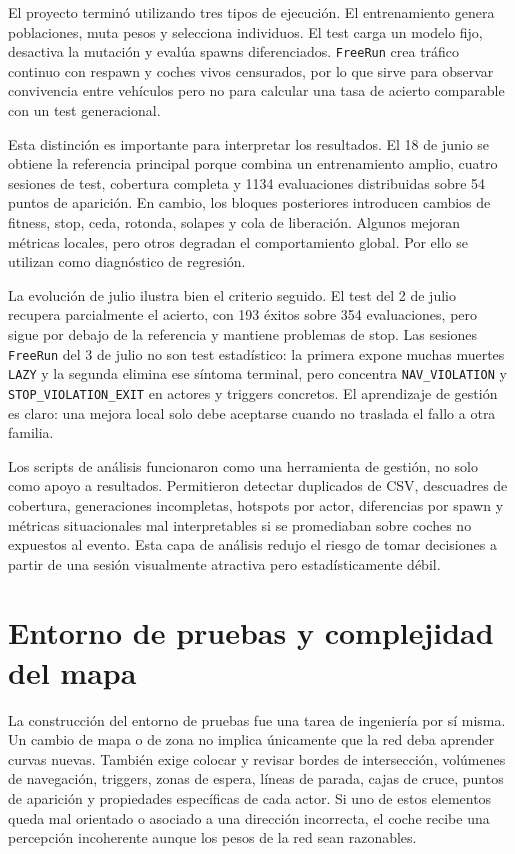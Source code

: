 El proyecto terminó utilizando tres tipos de ejecución. El entrenamiento genera poblaciones, muta pesos y selecciona individuos. El test carga un modelo fijo, desactiva la mutación y evalúa spawns diferenciados. \texttt{FreeRun} crea tráfico continuo con respawn y coches vivos censurados, por lo que sirve para observar convivencia entre vehículos pero no para calcular una tasa de acierto comparable con un test generacional.

Esta distinción es importante para interpretar los resultados. El 18 de junio se obtiene la referencia principal porque combina un entrenamiento amplio, cuatro sesiones de test, cobertura completa y 1134 evaluaciones distribuidas sobre 54 puntos de aparición. En cambio, los bloques posteriores introducen cambios de fitness, stop, ceda, rotonda, solapes y cola de liberación. Algunos mejoran métricas locales, pero otros degradan el comportamiento global. Por ello se utilizan como diagnóstico de regresión.

La evolución de julio ilustra bien el criterio seguido. El test del 2 de julio recupera parcialmente el acierto, con 193 éxitos sobre 354 evaluaciones, pero sigue por debajo de la referencia y mantiene problemas de stop. Las sesiones \texttt{FreeRun} del 3 de julio no son test estadístico: la primera expone muchas muertes \texttt{LAZY} y la segunda elimina ese síntoma terminal, pero concentra \texttt{NAV\_VIOLATION} y \texttt{STOP\_VIOLATION\_EXIT} en actores y triggers concretos. El aprendizaje de gestión es claro: una mejora local solo debe aceptarse cuando no traslada el fallo a otra familia.

Los scripts de análisis funcionaron como una herramienta de gestión, no solo como apoyo a resultados. Permitieron detectar duplicados de CSV, descuadres de cobertura, generaciones incompletas, hotspots por actor, diferencias por spawn y métricas situacionales mal interpretables si se promediaban sobre coches no expuestos al evento. Esta capa de análisis redujo el riesgo de tomar decisiones a partir de una sesión visualmente atractiva pero estadísticamente débil.

\section{Entorno de pruebas y complejidad del mapa}

La construcción del entorno de pruebas fue una tarea de ingeniería por sí misma. Un cambio de mapa o de zona no implica únicamente que la red deba aprender curvas nuevas. También exige colocar y revisar bordes de intersección, volúmenes de navegación, triggers, zonas de espera, líneas de parada, cajas de cruce, puntos de aparición y propiedades específicas de cada actor. Si uno de estos elementos queda mal orientado o asociado a una dirección incorrecta, el coche recibe una percepción incoherente aunque los pesos de la red sean razonables.

